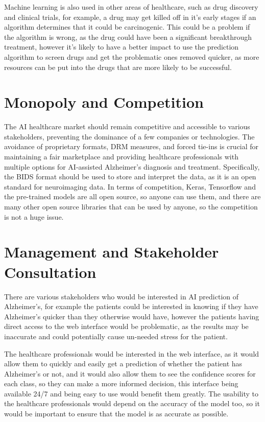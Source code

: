 \documentclass[]{final_report}
\begin{document}
Machine learning is also used in other areas of healthcare, such as drug discovery and clinical trials, for example, a drug may get killed off in it's early stages if an algorithm determines that it could be carcinogenic. This could be a problem if the algorithm is wrong, as the drug could have been a significant breakthrough treatment, however it's likely to have a better impact to use the prediction algorithm to screen drugs and get the problematic ones removed quicker, as more resources can be put into the drugs that are more likely to be successful.\cite{10.3389/frai.2021.757780}

\section{Monopoly and Competition}

The AI healthcare market should remain competitive and accessible to various stakeholders, preventing the dominance of a few companies or technologies. The avoidance of proprietary formats, DRM measures, and forced tie-ins is crucial for maintaining a fair marketplace and providing healthcare professionals with multiple options for AI-assisted Alzheimer's diagnosis and treatment. Specifically, the BIDS format should be used to store and interpret the data, as it is an open standard for neuroimaging data. In terms of competition, Keras, Tensorflow and the pre-trained models are all open source, so anyone can use them, and there are many other open source libraries that can be used by anyone, so the competition is not a huge issue.

\section{Management and Stakeholder Consultation}

There are various stakeholders who would be interested in AI prediction of Alzheimer's, for example the patients could be interested in knowing if they have Alzheimer's quicker than they otherwise would have, however the patients having direct access to the web interface would be problematic, as the results may be inaccurate and could potentially cause un-needed stress for the patient.

The healthcare professionals would be interested in the web interface, as it would allow them to quickly and easily get a prediction of whether the patient has Alzheimer's or not, and it would also allow them to see the confidence scores for each class, so they can make a more informed decision, this interface being available 24/7 and being easy to use would benefit them greatly. The usability to the healthcare professionals would depend on the accuracy of the model too, so it would be important to ensure that the model is as accurate as possible.
\end{document}
